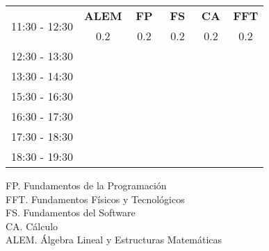 \documentclass[10pt,spanish, landscape]{article}
\begin{document}
\begin{minipage}{0.7\textwidth}
\begin{tabular}{|c|ccc|ccc|ccc|ccc|ccc|}
 \hline
\multirow{2}{*}{11:30 - 12:30} & \multicolumn{3}{|c|}{ \cellcolor{grisclaro} \textbf{ALEM}}& \multicolumn{3}{|c|}{ \cellcolor{grisclaro} \textbf{FP}}& \multicolumn{3}{|c|}{ \cellcolor{grisclaro} \textbf{FS}}& \multicolumn{3}{|c|}{ \cellcolor{grisclaro} \textbf{CA}}& \multicolumn{3}{|c|}{ \cellcolor{grisclaro} \textbf{FFT}}\\ 
& \multicolumn{3}{|c|}{ \cellcolor{grisclaro} {\footnotesize 0.2}}& \multicolumn{3}{|c|}{ \cellcolor{grisclaro} {\footnotesize 0.2}}& \multicolumn{3}{|c|}{ \cellcolor{grisclaro} {\footnotesize 0.2}}& \multicolumn{3}{|c|}{ \cellcolor{grisclaro} {\footnotesize 0.2}}& \multicolumn{3}{|c|}{ \cellcolor{grisclaro} {\footnotesize 0.2}}\\ 
 \hline
\multirow{2}{*}{12:30 - 13:30}  &  &  &  &  &  &  &  &  &  &  &  &  &  &  & \\ 
 &  &  &  &  &  &  &  &  &  &  &  &  &  &  & \\ 
 \hline
\multirow{2}{*}{13:30 - 14:30}  &  &  &  &  &  &  &  &  &  &  &  &  &  &  & \\ 
 &  &  &  &  &  &  &  &  &  &  &  &  &  &  & \\ 
 \hline
\multirow{2}{*}{15:30 - 16:30}  &  &  &  &  &  &  &  &  &  &  &  &  &  &  & \\ 
 &  &  &  &  &  &  &  &  &  &  &  &  &  &  & \\ 
 \hline
\multirow{2}{*}{16:30 - 17:30}  &  &  &  &  &  &  &  &  &  &  &  &  &  &  & \\ 
 &  &  &  &  &  &  &  &  &  &  &  &  &  &  & \\ 
 \hline
\multirow{2}{*}{17:30 - 18:30}  &  &  &  &  &  &  &  &  &  &  &  &  &  &  & \\ 
 &  &  &  &  &  &  &  &  &  &  &  &  &  &  & \\ 
 \hline
\multirow{2}{*}{18:30 - 19:30}  &  &  &  &  &  &  &  &  &  &  &  &  &  &  & \\ 
 &  &  &  &  &  &  &  &  &  &  &  &  &  &  & \\ 
 \hline

\end{tabular}
\end{minipage}
\begin{minipage}{0.25\textwidth}
FP. Fundamentos de la Programación\\[0.5cm]
FFT. Fundamentos Físicos y Tecnológicos\\[0.5cm]
FS. Fundamentos del Software\\[0.5cm]
CA. Cálculo\\[0.5cm]
ALEM. Álgebra Lineal y Estructuras Matemáticas\\[0.5cm]
\end{minipage}
\newpage
\end{document}
